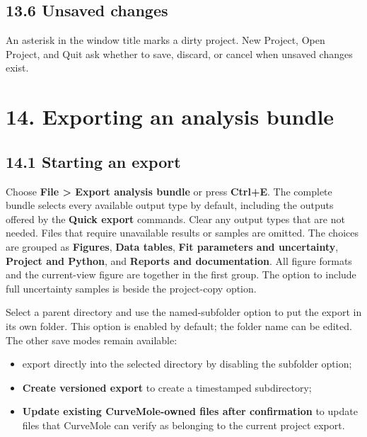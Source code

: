 \documentclass[
  10pt,
  a4paper,
  oneside]{scrreprt}
\providecommand{\tightlist}{%
  \setlength{\itemsep}{0pt}\setlength{\parskip}{0pt}}
\begin{document}
\hypertarget{unsaved-changes}{%
\section{13.6 Unsaved changes}\label{unsaved-changes}}

An asterisk in the window title marks a dirty project. New Project, Open
Project, and Quit ask whether to save, discard, or cancel when unsaved
changes exist.

\hypertarget{exporting-an-analysis-bundle}{%
\chapter{14. Exporting an analysis
bundle}\label{exporting-an-analysis-bundle}}

\hypertarget{starting-an-export}{%
\section{14.1 Starting an export}\label{starting-an-export}}

Choose \textbf{File \textgreater{} Export analysis bundle} or press
\textbf{Ctrl+E}. The complete bundle selects every available output type
by default, including the outputs offered by the \textbf{Quick export}
commands. Clear any output types that are not needed. Files that require
unavailable results or samples are omitted. The choices are grouped as
\textbf{Figures}, \textbf{Data tables}, \textbf{Fit parameters and
uncertainty}, \textbf{Project and Python}, and \textbf{Reports and
documentation}. All figure formats and the current-view figure are
together in the first group. The option to include full uncertainty
samples is beside the project-copy option.

Select a parent directory and use the named-subfolder option to put the
export in its own folder. This option is enabled by default; the folder
name can be edited. The other save modes remain available:

\begin{itemize}
\tightlist
\item
  export directly into the selected directory by disabling the subfolder
  option;
\item
  \textbf{Create versioned export} to create a timestamped subdirectory;
\item
  \textbf{Update existing CurveMole-owned files after confirmation} to
  update files that CurveMole can verify as belonging to the current
  project export.
\end{itemize}
\end{document}
